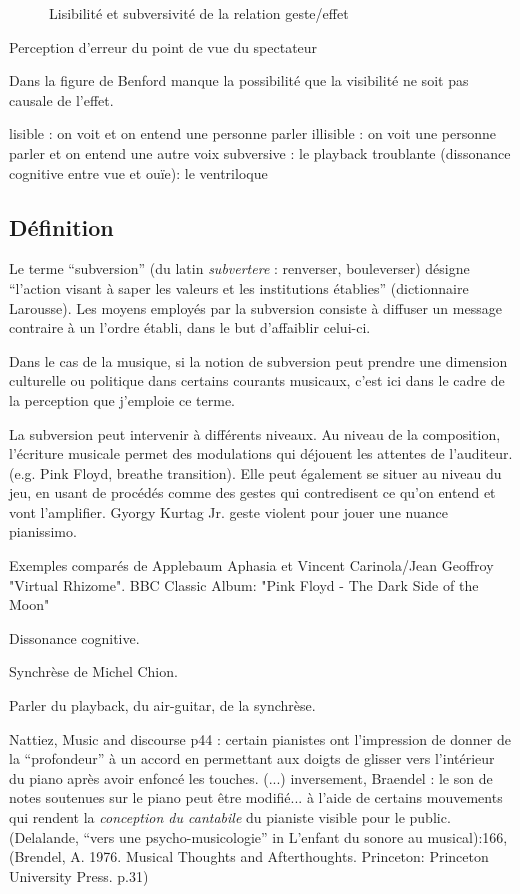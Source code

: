 \begin{figure}[!htbp]
\begin{minipage}[t]{0.48\textwidth}
		\caption{Lisibilité et subversivité de la relation geste/effet}
		\label{fig:gesture:lisibility_subversion}
	\end{minipage}
\end{figure}


Perception d'erreur du point de vue du spectateur \cite{fyans_ecological_2012}

Dans la figure de Benford manque la possibilité que la visibilité ne soit pas causale de l'effet.

lisible : on voit et on entend une personne parler
illisible : on voit une personne parler et on entend une autre voix
subversive : le playback
troublante (dissonance cognitive entre vue et ouïe): le ventriloque

\subsection{Définition} 

Le terme ``subversion'' (du latin \textit{subvertere} : renverser, bouleverser) désigne ``l'action visant à saper les valeurs et les institutions établies'' (dictionnaire Larousse). Les moyens employés par la subversion consiste à diffuser un message contraire à un l'ordre établi, dans le but d'affaiblir celui-ci.

Dans le cas de la musique, si la notion de subversion peut prendre une dimension culturelle ou politique dans certains courants musicaux, c'est ici dans le cadre de la perception que j'emploie ce terme.

La subversion peut intervenir à différents niveaux. Au niveau de la composition, l'écriture musicale permet des modulations qui déjouent les attentes de l'auditeur. (e.g. Pink Floyd, breathe transition). Elle peut également se situer au niveau du jeu, en usant de procédés comme des gestes qui contredisent ce qu'on entend et vont l'amplifier. Gyorgy Kurtag Jr. geste violent pour jouer une nuance pianissimo.

Exemples comparés de Applebaum Aphasia et Vincent Carinola/Jean Geoffroy "Virtual Rhizome".
BBC Classic Album: "Pink Floyd - The Dark Side of the Moon"

Dissonance cognitive.

Synchrèse de Michel Chion.

Parler du playback, du air-guitar, de la synchrèse.

Nattiez, Music and discourse p44 : certain pianistes ont l'impression de donner de la ``profondeur'' à un accord en permettant aux doigts de glisser vers l'intérieur du piano après avoir enfoncé les touches. (...) inversement, Braendel : le son de notes soutenues sur le piano peut être modifié... à l'aide de certains mouvements qui rendent la \textit{conception du cantabile} du pianiste visible pour le public. (Delalande, ``vers une psycho-musicologie'' in L'enfant du sonore au musical):166, (Brendel, A. 1976. Musical Thoughts and Afterthoughts. Princeton: Princeton University Press. p.31)

